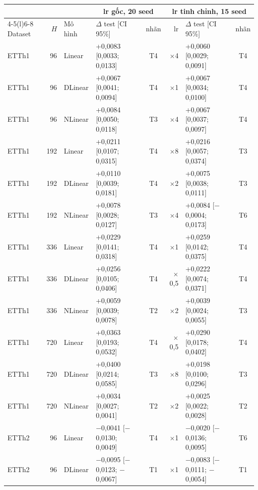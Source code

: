 {\footnotesize
\begin{longtable}{@{}lrl l c r l c@{}}
\toprule
 & & & \multicolumn{2}{c}{lr gốc, 20 seed} & \multicolumn{3}{c}{lr tinh chỉnh, 15 seed} \\
\cmidrule(lr){4-5}\cmidrule(l){6-8}
Dataset & $H$ & Mô hình & $\Delta$ test [CI 95\%] & nhãn & lr & $\Delta$ test [CI 95\%] & nhãn \\
\midrule
\endhead
ETTh1 & 96 & Linear & +0{,}0083 [0{,}0033; 0{,}0133] & T4 & $\times$4 & +0{,}0060 [0{,}0029; 0{,}0091] & T4 \\
ETTh1 & 96 & DLinear & +0{,}0067 [0{,}0041; 0{,}0094] & T4 & $\times$1 & +0{,}0067 [0{,}0034; 0{,}0100] & T4 \\
ETTh1 & 96 & NLinear & +0{,}0084 [0{,}0050; 0{,}0118] & T3 & $\times$4 & +0{,}0067 [0{,}0037; 0{,}0097] & T4 \\
ETTh1 & 192 & Linear & +0{,}0211 [0{,}0107; 0{,}0315] & T4 & $\times$8 & +0{,}0216 [0{,}0057; 0{,}0374] & T3 \\
ETTh1 & 192 & DLinear & +0{,}0110 [0{,}0039; 0{,}0181] & T4 & $\times$2 & +0{,}0075 [0{,}0038; 0{,}0111] & T3 \\
ETTh1 & 192 & NLinear & +0{,}0078 [0{,}0028; 0{,}0127] & T3 & $\times$4 & +0{,}0084 [$-$0{,}0004; 0{,}0173] & T6 \\
ETTh1 & 336 & Linear & +0{,}0229 [0{,}0141; 0{,}0318] & T4 & $\times$1 & +0{,}0259 [0{,}0142; 0{,}0375] & T4 \\
ETTh1 & 336 & DLinear & +0{,}0256 [0{,}0105; 0{,}0406] & T4 & $\times$0{,}5 & +0{,}0222 [0{,}0074; 0{,}0371] & T4 \\
ETTh1 & 336 & NLinear & +0{,}0059 [0{,}0039; 0{,}0078] & T2 & $\times$2 & +0{,}0039 [0{,}0024; 0{,}0055] & T3 \\
ETTh1 & 720 & Linear & +0{,}0363 [0{,}0193; 0{,}0532] & T4 & $\times$0{,}5 & +0{,}0290 [0{,}0178; 0{,}0402] & T4 \\
ETTh1 & 720 & DLinear & +0{,}0400 [0{,}0214; 0{,}0585] & T3 & $\times$8 & +0{,}0198 [0{,}0100; 0{,}0296] & T3 \\
ETTh1 & 720 & NLinear & +0{,}0034 [0{,}0027; 0{,}0041] & T2 & $\times$2 & +0{,}0025 [0{,}0022; 0{,}0028] & T2 \\
\addlinespace[2pt]
ETTh2 & 96 & Linear & $-$0{,}0041 [$-$0{,}0130; 0{,}0049] & T4 & $\times$1 & $-$0{,}0020 [$-$0{,}0136; 0{,}0095] & T6 \\
ETTh2 & 96 & DLinear & $-$0{,}0095 [$-$0{,}0123; $-$0{,}0067] & T1 & $\times$1 & $-$0{,}0083 [$-$0{,}0111; $-$0{,}0054] & T1 \\

\end{longtable}}
